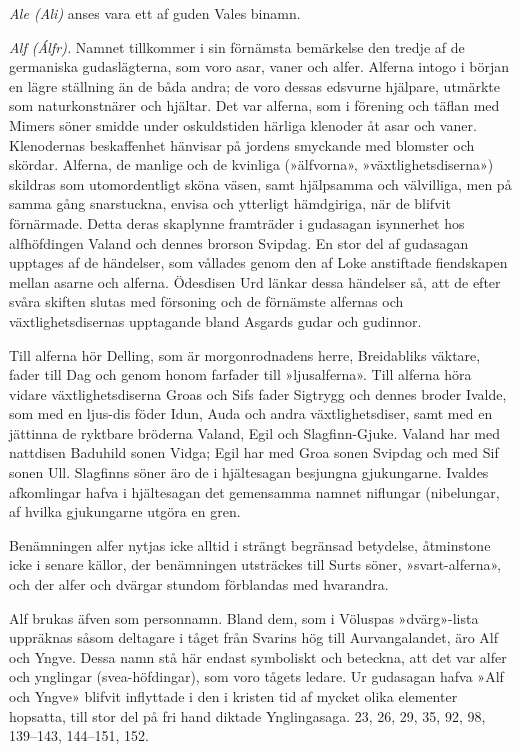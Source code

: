 \emph{Ale (Ali)} anses vara ett af guden Vales binamn.

\emph{Alf (Álfr).} Namnet tillkommer i sin förnämsta bemärkelse den
tredje af de germaniska gudaslägterna, som voro asar, vaner och alfer.
Alferna intogo i början en lägre ställning än de båda andra; de voro
dessas edsvurne hjälpare, utmärkte som naturkonstnärer och hjältar. Det
var alferna, som i förening och täflan med Mimers söner smidde under
oskuldstiden härliga klenoder åt asar och vaner. Klenodernas
beskaffenhet hänvisar på jordens smyckande med blomster och skördar.
Alferna, de manlige och de kvinliga (»älfvorna», »växtlighetsdiserna»)
skildras som utomordentligt sköna väsen, samt hjälpsamma och välvilliga,
men på samma gång snarstuckna, envisa och ytterligt hämdgiriga, när de
blifvit förnärmade. Detta deras skaplynne framträder i gudasagan
isynnerhet hos alfhöfdingen Valand och dennes brorson Svipdag. En stor
del af gudasagan upptages af de händelser, som vållades genom den af
Loke anstiftade fiendskapen mellan asarne och alferna. Ödesdisen Urd
länkar dessa händelser så, att de efter svåra skiften slutas med
försoning och de förnämste alfernas och växtlighetsdisernas upptagande
bland Asgards gudar och gudinnor.

Till alferna hör Delling, som är morgonrodnadens herre, Breidabliks
väktare, fader till Dag och genom honom farfader till »ljusalferna».
Till alferna höra vidare växtlighetsdiserna Groas och Sifs fader
Sigtrygg och dennes broder Ivalde, som med en ljus-dis föder Idun, Auda
och andra växtlighetsdiser, samt med en jättinna de ryktbare bröderna
Valand, Egil och Slagfinn-Gjuke. Valand har med nattdisen Baduhild sonen
Vidga; Egil har med Groa sonen Svipdag och med Sif sonen Ull. Slagfinns
söner äro de i hjältesagan besjungna gjukungarne. Ivaldes afkomlingar
hafva i hjältesagan det gemensamma namnet niflungar (nibelungar, af
hvilka gjukungarne utgöra en gren.

Benämningen alfer nytjas icke alltid i strängt begränsad betydelse,
åtminstone icke i senare källor, der benämningen utsträckes till Surts
söner, »svart-alferna», och der alfer och dvärgar stundom förblandas med
hvarandra.

Alf brukas äfven som personnamn. Bland dem, som i Völuspas »dvärg»-lista
uppräknas såsom deltagare i tåget från Svarins hög till Aurvangalandet,
äro Alf och Yngve. Dessa namn stå här endast symboliskt och beteckna,
att det var alfer och ynglingar (svea-höfdingar), som voro tågets
ledare. Ur gudasagan hafva »Alf och Yngve» blifvit inflyttade i den i
kristen tid af mycket olika elementer hopsatta, till stor del på fri
hand diktade Ynglingasaga. 23, 26, 29, 35, 92, 98, 139--143, 144--151,
152.

